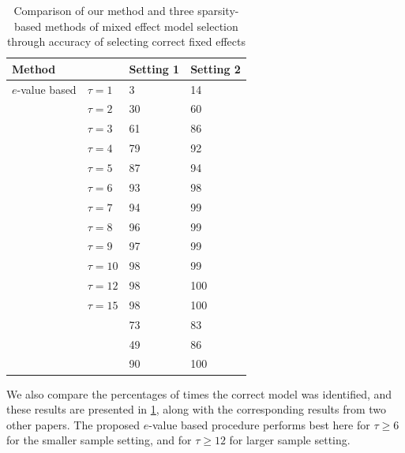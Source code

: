 %
\begin{table}[t]
	\centering
	\begin{scriptsize}
    \begin{tabular}{llll}
    \hline
    Method          & ~ & Setting 1 & Setting 2 \\ \hline
    $e$-value based     & $\tau=1$ & 3         & 14       \\
    ~               & $\tau=2$ & 30      & 60        \\
    ~               & $\tau=3$ & 61        & 86      \\
    ~               & $\tau=4$ & 79        & 92      \\
    ~               & $\tau=5$ & 87        & 94       \\
    ~               & $\tau=6$ & 93      & 98       \\
    ~               & $\tau=7$ & 94       & 99       \\
    ~               & $\tau=8$ & 96       & 99       \\
    ~               & $\tau=9$ & 97       & 99       \\
    ~               & $\tau=10$ & 98       & 99       \\
    ~               & $\tau=12$ & 98       & 100       \\
    ~               & $\tau=15$ & 98       & 100       \\\hline
    \cite{BondellKrishnaGhosh10} & ~ & 73        & 83        \\
    \cite{PengLu12}         & ~ & 49        & 86        \\
    \cite{FanLi12}           & ~ & 90        & 100       \\ \hline
    \end{tabular}
    \caption{Comparison of our method and three sparsity-based methods of mixed effect model selection through accuracy of selecting correct fixed effects}
	\label{table:simtable2MS}
    \end{scriptsize}
\end{table}

We also compare the percentages of times the correct model was identified, and these results are presented in \ref{table:simtable2MS}, along with the corresponding results from two other papers. The proposed $e$-value based procedure performs best here for $\tau \geq 6$ for the smaller sample setting, and for $\tau\geq 12$ for larger sample setting. 

